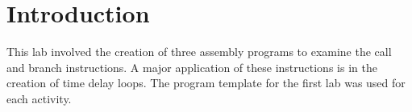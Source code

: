 \section{Introduction}

This lab involved the creation of three assembly programs to examine the call and branch instructions.
A major application of these instructions is in the creation of time delay loops.
The program template for the first lab was used for each activity.

